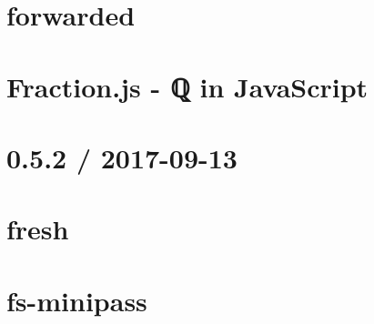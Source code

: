 \documentclass[twoside]{book}
\newcommand{\+}{\discretionary{\mbox{\scriptsize$\hookleftarrow$}}{}{}}
\begin{document}
\chapter{forwarded}
\label{md__c___users_vaishnavi_jadhav__desktop__developer_code_mean_stack_example_client_node_modules_forwarded__r_e_a_d_m_e}

\chapter{Fraction.\+js -\/ ℚ in Java\+Script}
\label{md__c___users_vaishnavi_jadhav__desktop__developer_code_mean_stack_example_client_node_modules_fraction_js__r_e_a_d_m_e}

\chapter{0.5.2 / 2017-\/09-\/13}
\label{md__c___users_vaishnavi_jadhav__desktop__developer_code_mean_stack_example_client_node_modules_fresh__h_i_s_t_o_r_y}

\chapter{fresh}
\label{md__c___users_vaishnavi_jadhav__desktop__developer_code_mean_stack_example_client_node_modules_fresh__r_e_a_d_m_e}

\chapter{fs-\/minipass}
\label{md__c___users_vaishnavi_jadhav__desktop__developer_code_mean_stack_example_client_node_modules_fs_minipass__r_e_a_d_m_e}

\end{document}
